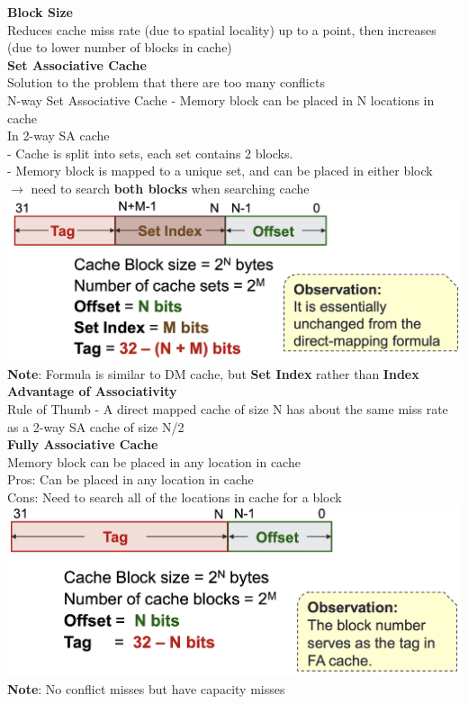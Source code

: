 \documentclass[10pt, a4paper]{article}
\newcommand{\highlight}[1]{{\color{red}\textbf{#1}}}
\newcommand{\blue}[1]{{\color{MidnightBlue}#1}}
\newcommand{\red}[1]{{\color{red}#1}}
\newcommand{\green}[1]{{\color{ForestGreen}#1}}
\begin{document}
\begin{multicols*}{3}
		\textbf{Block Size}\\
		Reduces cache miss rate (due to spatial locality) up to a point, then increases (due to lower number of blocks in cache)\\

		\textbf{Set Associative Cache}\\
		Solution to the problem that there are too many conflicts\\
		\blue{N-way Set Associative Cache} - Memory block can be placed in N locations in cache\\

		In 2-way SA cache\\
		- Cache is split into sets, each set contains 2 blocks.\\
		- Memory block is mapped to a unique set, and can be placed in either block\\
		$\rightarrow$ need to search \highlight{both blocks} when searching cache\\
		\includegraphics[scale=.3]{./assets/SACache}
		\highlight{Note}: Formula is similar to DM cache, but \highlight{Set Index} rather than \highlight{Index}\\

		\textbf{Advantage of Associativity}\\
		Rule of Thumb - A direct mapped cache of size N has about the same miss rate as a 2-way SA cache of size N/2\\

		\textbf{Fully Associative Cache}\\
		Memory block can be placed in any location in cache\\
		\green{Pros}: Can be placed in any location in cache\\
		\red{Cons}: Need to search all of the locations in cache for a block\\
		\includegraphics[scale=.28]{./assets/FACache}\\
		\highlight{Note}: No conflict misses but have capacity misses\\


\end{multicols*}
\end{document}
